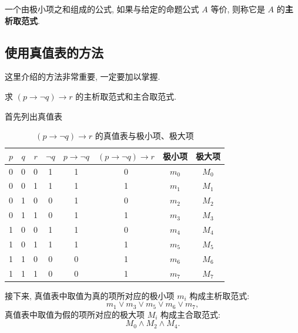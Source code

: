 \documentclass[10pt,UTF8]{book} %
\begin{document}
\begin{definition}
    一个由极小项之和组成的公式, 如果与给定的命题公式 $A$ 等价, 则称它是 $A$ 的\textbf{主析取范式}.
\end{definition}


\subsection{使用真值表的方法}

这里介绍的方法非常重要, 一定要加以掌握.

\begin{example}
    求 $(p \rightarrow \lnot q) \rightarrow r$ 的主析取范式和主合取范式.
    \begin{sol}
        首先列出真值表
        \begin{table}[H]
            \centering
            \caption{$(p \rightarrow \lnot q) \rightarrow r$ 的真值表与极小项、极大项}
            \begin{tabular}{ccc|ccc|cc}
                \hline
                $p$ & $q$ & $r$ & $\lnot q$ & $p \to \lnot q$ & $(p \rightarrow \lnot q) \rightarrow r$ & 极小项 & 极大项 \\ 
                \hline 
                0 & 0 & 0 & 1 & 1 & 0 & $m_0$ & $M_0$ \\
                0 & 0 & 1 & 1 & 1 & 1 & $m_1$ & $M_1$ \\
                0 & 1 & 0 & 0 & 1 & 0 & $m_2$ & $M_2$ \\
                0 & 1 & 1 & 0 & 1 & 1 & $m_3$ & $M_3$ \\
                1 & 0 & 0 & 1 & 1 & 0 & $m_4$ & $M_4$ \\
                1 & 0 & 1 & 1 & 1 & 1 & $m_5$ & $M_5$ \\
                1 & 1 & 0 & 0 & 0 & 1 & $m_6$ & $M_6$ \\
                1 & 1 & 1 & 0 & 0 & 1 & $m_7$ & $M_7$ \\
                \hline
            \end{tabular}
        \end{table}
        接下来, 真值表中取值为真的项所对应的极小项 $m_i$ 构成主析取范式:
        \[ m_1 \vee m_3 \vee m_5 \vee m_6 \vee m_7, \]
        真值表中取值为假的项所对应的极大项 $M_i$ 构成主合取范式:
        \[ M_0 \wedge M_2 \wedge M_4. \]
    \end{sol}
\end{example}
\end{document}

